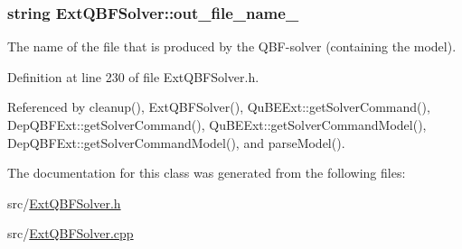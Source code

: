 \hypertarget{classExtQBFSolver_a0efb35aa9b807dec521ad3406eaf664d}{
\subsubsection[{out\-\_\-file\-\_\-name\-\_\-}]{\setlength{\rightskip}{0pt plus 5cm}string Ext\-Q\-B\-F\-Solver\-::out\-\_\-file\-\_\-name\-\_\-\hspace{0.3cm}{\ttfamily [protected]}}}\label{classExtQBFSolver_a0efb35aa9b807dec521ad3406eaf664d}


The name of the file that is produced by the Q\-B\-F-\/solver (containing the model). 



Definition at line 230 of file Ext\-Q\-B\-F\-Solver.\-h.



Referenced by cleanup(), Ext\-Q\-B\-F\-Solver(), Qu\-B\-E\-Ext\-::get\-Solver\-Command(), Dep\-Q\-B\-F\-Ext\-::get\-Solver\-Command(), Qu\-B\-E\-Ext\-::get\-Solver\-Command\-Model(), Dep\-Q\-B\-F\-Ext\-::get\-Solver\-Command\-Model(), and parse\-Model().



The documentation for this class was generated from the following files\-:\begin{DoxyCompactItemize}
\item 
src/\hyperlink{ExtQBFSolver_8h}{Ext\-Q\-B\-F\-Solver.\-h}\item 
src/\hyperlink{ExtQBFSolver_8cpp}{Ext\-Q\-B\-F\-Solver.\-cpp}\end{DoxyCompactItemize}
